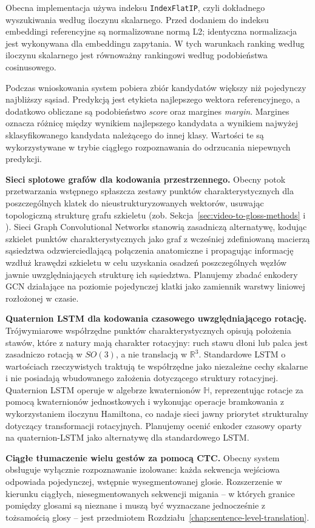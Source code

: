 Obecna implementacja używa indeksu \texttt{IndexFlatIP}, czyli dokładnego
wyszukiwania według iloczynu skalarnego. Przed dodaniem do indeksu embeddingi
referencyjne są normalizowane normą L2; identyczna normalizacja jest wykonywana
dla embeddingu zapytania. W tych warunkach ranking według iloczynu skalarnego
jest równoważny rankingowi według podobieństwa cosinusowego.

Podczas wnioskowania system pobiera zbiór kandydatów większy niż pojedynczy
najbliższy sąsiad. Predykcją jest etykieta najlepszego wektora referencyjnego,
a dodatkowo obliczane są podobieństwo \emph{score} oraz margines
\emph{margin}. Margines oznacza różnicę między wynikiem najlepszego kandydata
a wynikiem najwyżej sklasyfikowanego kandydata należącego do innej klasy.
Wartości te są wykorzystywane w trybie ciągłego rozpoznawania do odrzucania
niepewnych predykcji.

\textbf{Sieci splotowe grafów dla kodowania przestrzennego.} Obecny potok
przetwarzania wstępnego spłaszcza zestawy punktów charakterystycznych
dla poszczególnych klatek do nieustrukturyzowanych wektorów, usuwając
topologiczną strukturę grafu szkieletu (zob. Sekcja~\ref{sec:video-to-gloss-methods}
i \cite{correia2019stgcn}). Sieci Graph Convolutional Networks stanowią
zasadniczą alternatywę, kodując szkielet punktów charakterystycznych jako
graf z wcześniej zdefiniowaną macierzą sąsiedztwa odzwierciedlającą
połączenia anatomiczne i propagując informację wzdłuż krawędzi szkieletu
w celu uzyskania osadzeń poszczególnych węzłów jawnie uwzględniających
strukturę ich sąsiedztwa. Planujemy zbadać enkodery GCN działające na
poziomie pojedynczej klatki jako zamiennik warstwy liniowej rozłożonej
w czasie.

\textbf{Quaternion LSTM dla kodowania czasowego uwzględniającego rotację.}
Trójwymiarowe współrzędne punktów charakterystycznych opisują położenia
stawów, które z natury mają charakter rotacyjny: ruch stawu dłoni lub
palca jest zasadniczo rotacją w $SO(3)$, a nie translacją w $\mathbb{R}^3$.
Standardowe LSTM o wartościach rzeczywistych traktują te współrzędne jako
niezależne cechy skalarne i nie posiadają wbudowanego założenia dotyczącego
struktury rotacyjnej. Quaternion LSTM operuje w algebrze kwaternionów
$\mathbb{H}$, reprezentując rotacje za pomocą kwaternionów jednostkowych
i wykonując operacje bramkowania z wykorzystaniem iloczynu Hamiltona,
co nadaje sieci jawny priorytet strukturalny dotyczący transformacji
rotacyjnych. Planujemy ocenić enkoder czasowy oparty na quaternion-LSTM
jako alternatywę dla standardowego LSTM.

\textbf{Ciągłe tłumaczenie wielu gestów za pomocą CTC.} Obecny system
obsługuje wyłącznie rozpoznawanie izolowane: każda sekwencja wejściowa
odpowiada pojedynczej, wstępnie wysegmentowanej glosie. Rozszerzenie
w kierunku ciągłych, niesegmentowanych sekwencji migania -- w których
granice pomiędzy glosami są nieznane i muszą być wyznaczane jednocześnie
z tożsamością glosy -- jest przedmiotem Rozdziału~\ref{chap:sentence-level-translation}.
